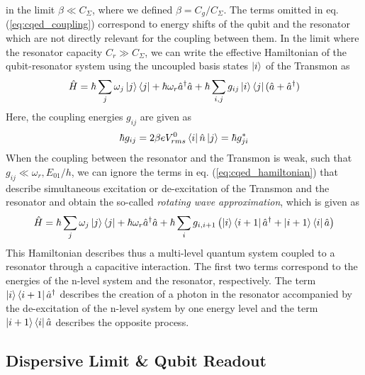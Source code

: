 %
in the limit $\beta \ll C_\Sigma$, where we defined $\beta = C_g/C_\Sigma$. The terms omitted in eq. (\ref{eq:cqed_coupling}) correspond to energy shifts of the qubit and the resonator which are not directly relevant for the coupling between them. 
 In the limit where the resonator capacity $C_r \gg C_\Sigma$, we can write the effective Hamiltonian of the qubit-resonator system using the uncoupled basis states $\left| i \right>$ of the Transmon as
%
\begin{equation}
\hat{H} = \hbar \sum\limits_j \omega_j \left| j \right>\left< j \right| + \hbar \omega_r \hat{a}^\dagger \hat{a} + \hbar \sum\limits_{i,j} g_{ij} \left| i \right>\left< j \right|(\hat{a}+\hat{a}^\dagger) \label{eq:cqed_hamiltonian}
\end{equation}
%
Here, the coupling energies $g_{ij}$ are given as
%
\begin{equation}
\hbar g_{ij} = 2\beta e V_{rms}^0 \left< i \right|\hat{n}\left| j \right> = \hbar g_{ji}^*
\end{equation}
%
When the coupling between the resonator and the Transmon is weak, such that $g_{ij} \ll \omega_r,E_{01}/h$, we can ignore the terms in eq. (\ref{eq:cqed_hamiltonian}) that describe simultaneous excitation or de-excitation of the Transmon and the resonator and obtain the so-called {\it rotating wave approximation}, which is given as
%
\begin{equation}
\hat{H} = \hbar \sum\limits_j \omega_j \left| j \right>\left< j \right|+\hbar \omega_r \hat{a}^\dagger \hat{a} + \hbar \sum\limits_i g_{i,i+1}\left(\left| i \right>\left< i+1 \right|\hat{a}^\dagger +\left| i+1 \right>\left< i \right|\hat{a}\right) \label{eq:cqed_rotating_wave}
\end{equation}
%
This Hamiltonian describes thus a multi-level quantum system coupled to a resonator through a capacitive interaction. The first two terms correspond to the energies of the n-level system and the resonator, respectively. The term $\left| i \right>\left< i+1 \right|\hat{a}^\dagger$ describes the creation of a photon in the resonator accompanied by the de-excitation of the n-level system by one energy level and the term $\left| i+1 \right>\left< i \right|\hat{a}$ describes the opposite process.

\subsection{Dispersive Limit \& Qubit Readout}

